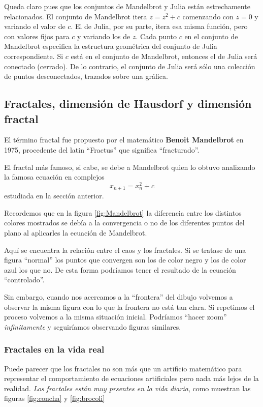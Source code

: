 Queda claro pues que los conjuntos de Mandelbrot y Julia están estrechamente relacionados. El conjunto de Mandelbrot itera $z=z^2+c$ comenzando con $z = 0$ y variando el valor de $c$. El de Julia, por su parte, itera esa misma función, pero con valores fijos para $c$ y variando los de $z$. Cada punto $c$ en el conjunto de Mandelbrot especifica la estructura geométrica del conjunto de Julia correspondiente. Si $c$ está en el conjunto de Mandelbrot, entonces el de Julia será conectado (cerrado). De lo contrario, el conjunto de Julia será sólo una colección de puntos desconectados, trazados sobre una gráfica.

\subsection{Fractales, dimensión de Hausdorf y dimensión fractal}

El término fractal fue propuesto por el matemático \textbf{Benoit Mandelbrot} en 1975, procedente del latin ``Fractus'' que significa ``fracturado''.

El fractal más famoso, si cabe, se debe a Mandelbrot quien lo obtuvo analizando la famosa ecuación en complejos
\[x_{n+1} = x_n^2 + c\]
estudiada en la sección anterior.

Recordemos que en la figura \ref{fig:Mandelbrot} la diferencia entre los distintos colores mostrados se debía a la convergencia o no de los diferentes puntos del plano al aplicarles la ecuación de Mandelbrot.

Aquí se encuentra la relación entre el caos y los fractales. Si se tratase de una figura ``normal'' los puntos que convergen son los de color negro y los de color azul los que no. De esta forma podríamos tener el resultado de la ecuación ``controlado''.

Sin embargo, cuando nos acercamos a la ``frontera'' del dibujo volvemos a observar la misma figura con lo que la frontera no está tan clara. Si repetimos el proceso volvemos a la misma situación inicial. Podríamos ``hacer zoom'' \emph{infinitamente} y seguiríamos observando figuras similares.

\subsubsection{Fractales en la vida real}
Puede parecer que los fractales no son más que un artificio matemático para representar el comportamiento de ecuaciones artificiales pero nada más lejos de la realidad. \emph{Los fractales están muy prsentes en la vida diaria}, como muestran las figuras \ref{fig:concha} y \ref{fig:brocoli}

